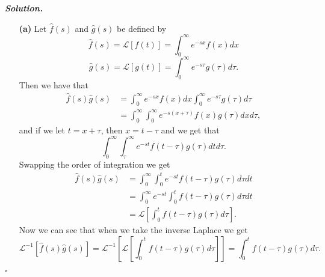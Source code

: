 \documentclass[12pt]{report}
\newenvironment{solution}[1][\it{Solution}]{\textbf{#1. } }{$\square$}
\def\L{{\mathcal{L}}}
\newcommand{\braces}[1]{{\left[#1\right]}} %
\begin{document}
\begin{solution}
    \noindent
    \begin{enumerate}
        \item [{\bf (a)}]
        Let $\hat{f}(s)$ and $\hat{g}(s)$ be defined by
        \[\hat{f}(s) = \L[f(t)] = \int_0^\infty e^{-sx}f(x)dx\]
        \[\hat{g}(s) = \L[g(t)] = \int_0^\infty e^{-s\tau}g(\tau)d\tau.\]
        Then we have that
        \begin{align*}
            \hat{f}(s)\hat{g}(s) &= \int_0^\infty e^{-sx}f(x)dx\int_0^\infty e^{-s\tau}g(\tau)d\tau\\
            &=\int_0^\infty\int_0^\infty e^{-s(x + \tau)}f(x)g(\tau)dxd\tau,
        \end{align*}
        and if we let $t = x + \tau$, then $x = t - \tau$ and we get that
        \[\int_0^\infty \int_\tau^\infty e^{-st}f(t-\tau)g(\tau)dtd\tau.\]
        Swapping the order of integration we get 
        \begin{align*}
            \hat{f}(s)\hat{g}(s) &= \int_0^\infty \int_0^t e^{-st} f(t - \tau)g(\tau)d\tau dt\\
            &=\int_0^\infty e^{-st}\int_0^t f(t - \tau)g(\tau)d\tau dt\\
            &=\L\braces{\int_0^t f(t - \tau)g(\tau)d\tau}.
        \end{align*}
        Now we can see that when we take the inverse Laplace we get
        \[
            \L^{-1}\braces{\hat{f}(s)\hat{g}(s)} = \L^{-1}\braces{\L\braces{\int_0^t f(t - \tau)g(\tau)d\tau}} = \int_0^t f(t - \tau)g(\tau)d\tau.
        \]
        

\end{enumerate}
\end{solution}
\end{document}
